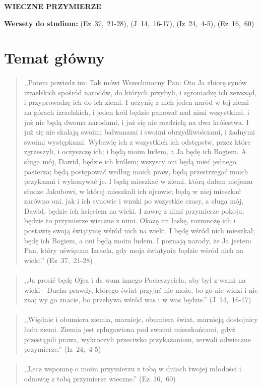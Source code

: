 \documentclass[10pt,a4paper,oneside]{article}
\begin{document}
\centerline{\textbf{\MakeUppercase{Wieczne przymierze}}}
\begin{center}
\textbf{Wersety do studium:} 
\mbox{(Ez 37, 21-28)}, \mbox{(J 14, 16-17)}, \mbox{(Iz 24, 4-5)}, \mbox{(Ez 16, 60)}
\end{center}
\section{Temat główny}
\paragraph{}
\begin{quote}
,,Potem powiedz im: Tak mówi Wszechmocny Pan: Oto Ja zbiorę synów izraelskich spośród narodów, do których przybyli, i zgromadzę ich zewsząd, i przyprowadzę ich do ich ziemi. I uczynię z nich jeden naród w tej ziemi na górach izraelskich, i jeden król będzie panował nad nimi wszystkimi, i już nie będą dwoma narodami, i już się nie rozdzielą na dwa królestwa. I już się nie skalają swoimi bałwanami i swoimi obrzydliwościami, i żadnymi swoimi występkami. Wybawię ich z wszystkich ich odstępstw, przez które zgrzeszyli, i oczyszczę ich; i będą moim ludem, a Ja będę ich Bogiem. A sługa mój, Dawid, będzie ich królem; wszyscy oni będą mieć jednego pasterza; będą postępować według moich praw, będą przestrzegać moich przykazań i wykonywać je. I będą mieszkać w ziemi, którą dałem mojemu słudze Jakubowi, w której mieszkali ich ojcowie; będą w niej mieszkać zarówno oni, jak i ich synowie i wnuki po wszystkie czasy, a sługa mój, Dawid, będzie ich księciem na wieki. I zawrę z nimi przymierze pokoju, będzie to przymierze wieczne z nimi. Okażę im łaskę, rozmnożę ich i postawię swoją świątynię wśród nich na wieki. I będę wśród nich mieszkał; będę ich Bogiem, a oni będą moim ludem. I poznają narody, że Ja jestem Pan, który uświęcam Izraela, gdy moja świątynia będzie wśród nich na wieki.'' \mbox{(Ez 37, 21-28)}
\end{quote}
\paragraph{}
\begin{quote}
,,Ja prosić będę Ojca i da wam innego Pocieszyciela, aby był z wami na wieki - Ducha prawdy, którego świat przyjąć nie może, bo go nie widzi i nie zna; wy go znacie, bo przebywa wśród was i w was będzie.'' \mbox{(J 14, 16-17)}
\end{quote}
\paragraph{}
\begin{quote}
,,Więdnie i obumiera ziemia, marnieje, obumiera świat, marnieją dostojnicy ludu ziemi. Ziemia jest splugawiona pod swoimi mieszkańcami, gdyż przestąpili prawa, wykroczyli przeciwko przykazaniom, zerwali odwieczne przymierze.'' \mbox{(Iz 24, 4-5)}
\end{quote}
\paragraph{}
\begin{quote}
,,Lecz wspomnę o moim przymierzu z tobą w dniach twojej młodości i odnowię z tobą przymierze wieczne.'' \mbox{(Ez 16, 60)}
\end{quote}
\end{document}
